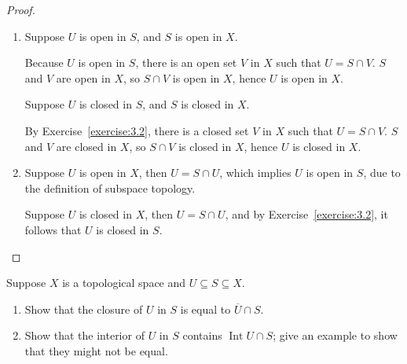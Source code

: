 \begin{proof}
	\begin{enumerate}[label={(\alph*)}]
		\item Suppose $U$ is open in $S$, and $S$ is open in $X$.

		      Because $U$ is open in $S$, there is an open set $V$ in $X$ such that $U = S\cap V$. $S$ and $V$ are open in $X$, so $S\cap V$ is open in $X$, hence $U$ is open in $X$.

		      Suppose $U$ is closed in $S$, and $S$ is closed in $X$.

		      By Exercise~\ref{exercise:3.2}, there is a closed set $V$ in $X$ such that $U = S\cap V$. $S$ and $V$ are closed in $X$, so $S\cap V$ is closed in $X$, hence $U$ is closed in $X$.
		\item Suppose $U$ is open in $X$, then $U = S\cap U$, which implies $U$ is open in $S$, due to the definition of subspace topology.

		      Suppose $U$ is closed in $X$, then $U = S\cap U$, and by Exercise~\ref{exercise:3.2}, it follows that $U$ is closed in $S$.
	\end{enumerate}
\end{proof}

\begin{exercise}{3.7}\label{exercise:3.7}
	Suppose $X$ is a topological space and $U\subseteq S\subseteq X$.
	\begin{enumerate}[label={(\alph*)}]
		\item Show that the closure of $U$ in $S$ is equal to $\overline{U}\cap S$.
		\item Show that the interior of $U$ in $S$ contains $\operatorname{Int}U\cap S$; give an example to show that they might not be equal.
	\end{enumerate}
\end{exercise}


